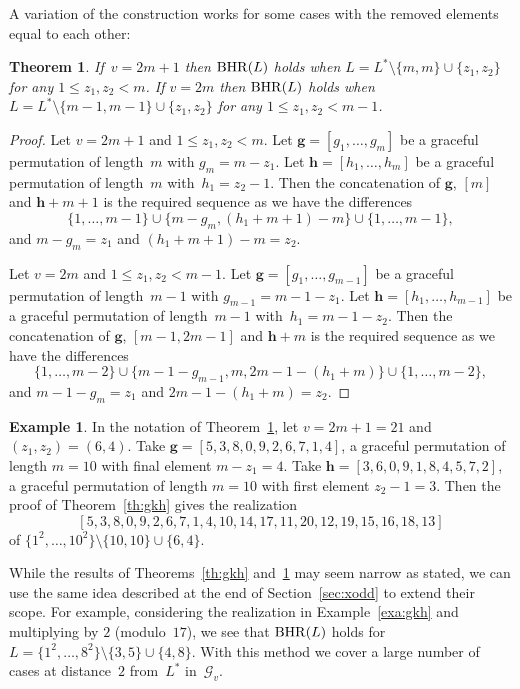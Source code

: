 \documentclass{amsart}
\newtheorem{thm}[prop]{Theorem}
\theoremstyle{definition}
\newtheorem{ex}[prop]{Example}
\numberwithin{equation}{section}
\def\BHR{\mathop{\rm BHR}}
\begin{document}
A variation of the construction works for some cases with the removed elements equal to each other:

\begin{thm}\label{th:gmm}
If~$v = 2m+1$ then $\BHR(L)$ holds when $L = L^* \setminus \{m,m\}   \cup \{z_1,z_2 \}$ for any  $1 \leq z_1,  z_2 < m$.
If $v = 2m$ then $\BHR(L)$ holds when $L = L^* \setminus \{m-1,m-1\}   \cup \{z_1,z_2 \}$ for any  $1 \leq z_1,  z_2 < m-1$.
\end{thm}

\begin{proof}
Let $v = 2m+1$ and $1 \leq z_1,  z_2 < m$.  Let $\bm{g} = [g_1, \ldots, g_m]$ be a graceful permutation of length~$m$ with $g_m = m-z_1$.
Let $\bm{h} = [h_1, \ldots, h_{m}]$ be a graceful permutation of length~$m$ with~$h_1 = z_2-1$.
Then the concatenation of $\bm{g}$, $[m]$ and  $\bm{h} + m+1$ is the required sequence as we have the differences
$$ \{ 1, \ldots, m-1 \} \cup \{ m-g_m , (h_1+m+1) -m  \} \cup \{ 1, \ldots, m-1 \},$$
and $m-g_m = z_1$ and $(h_1+m+1)-m = z_2$.

Let $v = 2m$ and  $1 \leq z_1,  z_2 < m-1$.  Let $\bm{g} = [g_1, \ldots, g_{m-1}]$ be a graceful permutation of length~$m-1$
with $g_{m-1} = m-1-z_1$.  Let $\bm{h} = [h_1, \ldots, h_{m-1}]$ be a graceful permutation of length~$m-1$ with~$h_1 = m-1-z_2$.
Then the concatenation of $\bm{g}$, $[m-1, 2m-1]$ and  $\bm{h} + m$ is the required sequence as we have the differences
$$ \{ 1, \ldots, m-2 \} \cup \{ m-1-g_{m-1} , m, 2m-1 - (h_1+m)  \} \cup \{ 1, \ldots, m-2 \},$$
and $m-1-g_m = z_1$ and $2m-1 - (h_1+m) = z_2$.
\end{proof}



\begin{ex}
In the notation of Theorem~\ref{th:gmm}, let $v = 2m+1 = 21$ and $(z_1, z_2) = (6,4)$.
Take $\bm{g} = [5,3,8,0,9,2,6,7,1,4]$, a graceful permutation of length $m=10$ with final element $m-z_1 = 4$.
Take $\bm{h} = [3,6,0,9,1,8,4,5,7,2]$, a graceful permutation of length $m = 10$ with first element $z_2 - 1 = 3$.
Then the proof of Theorem~\ref{th:gkh} gives the realization
$$[5,3,8,0,9,2,6,7,1,4, 10, 14,17,11,20,12,19,15,16,18,13   ]$$
of $\{ 1^2, \ldots, 10^2 \} \setminus \{10,10\} \cup \{6,4\}$.
\end{ex}

While the results of Theorems~\ref{th:gkh} and~\ref{th:gmm} may seem narrow as stated, we can use the same idea described at the end of
Section~\ref{sec:xodd} to extend their scope. For example, considering the realization in Example~\ref{exa:gkh} and multiplying by $2$
(modulo~$17$), we see that $\BHR(L)$ holds for $L = \{ 1^2, \ldots, 8^2 \} \setminus \{3,5\} \cup \{4,8\}$.
With this method we cover a large number of cases at distance~$2$ from~$L^*$ in~$\mathcal{G}_v$.
\end{document}
